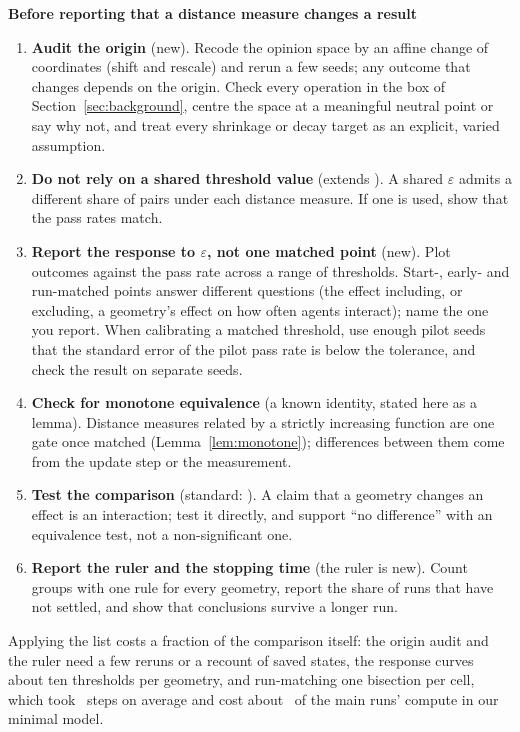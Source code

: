 \documentclass[11pt]{article}
\begin{document}
\begin{framed}
\noindent\textbf{Before reporting that a distance measure changes a result}
\begin{enumerate}
\item \textbf{Audit the origin} (new). Recode the opinion space by an affine change of coordinates (shift and rescale) and rerun a few seeds; any outcome that changes depends on the origin. Check every operation in the box of Section~\ref{sec:background}, centre the space at a meaningful neutral point or say why not, and treat every shrinkage or decay target as an explicit, varied assumption.
\item \textbf{Do not rely on a shared threshold value} (extends \citealp{lorenz2008}). A shared $\varepsilon$ admits a different share of pairs under each distance measure. If one is used, show that the pass rates match.
\item \textbf{Report the response to $\varepsilon$, not one matched point} (new). Plot outcomes against the pass rate across a range of thresholds. Start-, early- and run-matched points answer different questions (the effect including, or excluding, a geometry's effect on how often agents interact); name the one you report. When calibrating a matched threshold, use enough pilot seeds that the standard error of the pilot pass rate is below the tolerance, and check the result on separate seeds.
\item \textbf{Check for monotone equivalence} (a known identity, stated here as a lemma). Distance measures related by a strictly increasing function are one gate once matched (Lemma~\ref{lem:monotone}); differences between them come from the update step or the measurement.
\item \textbf{Test the comparison} (standard: \citealp{gelman2006,lakens2017}). A claim that a geometry changes an effect is an interaction; test it directly, and support ``no difference'' with an equivalence test, not a non-significant one.
\item \textbf{Report the ruler and the stopping time} (the ruler is new). Count groups with one rule for every geometry, report the share of runs that have not settled, and show that conclusions survive a longer run.
\end{enumerate}
\end{framed}
\noindent Applying the list costs a fraction of the comparison itself: the origin audit and the ruler need a few reruns or a recount of saved states, the response curves about ten thresholds per geometry, and run-matching one bisection per cell, which took \VCalIterMean\ steps on average and cost about \VCalCostShare\ of the main runs' compute in our minimal model.
\end{document}

